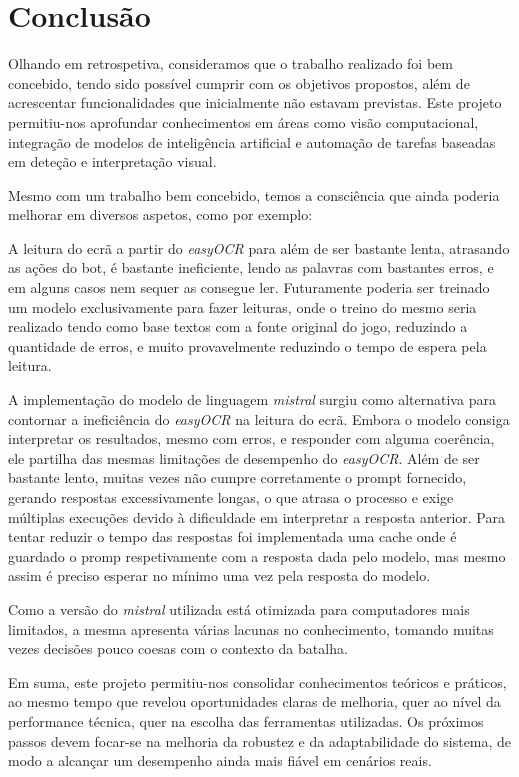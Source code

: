 \documentclass[12pt,a4paper,titlepage]{article}
\begin{document}


\section{Conclusão} \label{conclusao}
Olhando em retrospetiva, consideramos que o trabalho realizado foi bem concebido, tendo sido possível cumprir com os objetivos propostos, além de acrescentar funcionalidades que inicialmente não estavam previstas. Este projeto permitiu-nos aprofundar conhecimentos em áreas como visão computacional, integração de modelos de inteligência artificial e automação de tarefas baseadas em deteção e interpretação visual.


Mesmo com um trabalho bem concebido, temos a consciência que ainda poderia melhorar em diversos aspetos, como por exemplo: 

A leitura do ecrã a partir do \textit{easyOCR} para além de ser bastante lenta, atrasando as ações do bot, é bastante ineficiente, lendo as palavras com bastantes erros, e em alguns casos nem sequer as consegue ler. Futuramente poderia ser treinado um modelo exclusivamente para fazer leituras, onde o treino do mesmo seria realizado tendo como base textos com a fonte original do jogo, reduzindo a quantidade de erros, e muito provavelmente reduzindo o tempo de espera pela leitura.

A implementação do modelo de linguagem \textit{mistral} surgiu como alternativa para contornar a ineficiência do \textit{easyOCR} na leitura do ecrã. Embora o modelo consiga interpretar os resultados, mesmo com erros, e responder com alguma coerência, ele partilha das mesmas limitações de desempenho do \textit{easyOCR}. Além de ser bastante lento, muitas vezes não cumpre corretamente o prompt fornecido, gerando respostas excessivamente longas, o que atrasa o processo e exige múltiplas execuções devido à dificuldade em interpretar a resposta anterior. Para tentar reduzir o tempo das respostas foi implementada uma cache onde é guardado o promp respetivamente com a resposta dada pelo modelo, mas mesmo assim é preciso esperar no mínimo uma vez pela resposta do modelo. 

Como a versão do \textit{mistral} utilizada está otimizada para computadores mais limitados, a mesma apresenta várias lacunas no conhecimento, tomando muitas vezes decisões pouco coesas com o contexto da batalha.

Em suma, este projeto permitiu-nos consolidar conhecimentos teóricos e práticos, ao mesmo tempo que revelou oportunidades claras de melhoria, quer ao nível da performance técnica, quer na escolha das ferramentas utilizadas. Os próximos passos devem focar-se na melhoria da robustez e da adaptabilidade do sistema, de modo a alcançar um desempenho ainda mais fiável em cenários reais.
\end{document}
